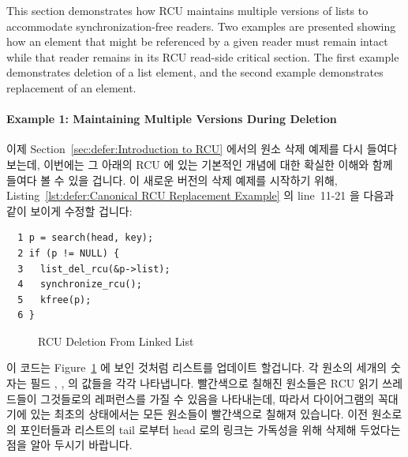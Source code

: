 This section demonstrates how RCU maintains multiple versions of
lists to accommodate synchronization-free readers.
Two examples are presented showing how an element
that might be referenced by a given reader must remain intact
while that reader remains in its RCU read-side critical section.
The first example demonstrates deletion of a list element,
and the second example demonstrates replacement of an element.
\fi

\paragraph{Example 1: Maintaining Multiple Versions During Deletion}
\label{sec:defer:Example 1: Maintaining Multiple Versions During Deletion}

이제 Section~\ref{sec:defer:Introduction to RCU} 에서의 원소 삭제 예제를 다시
들여다 보는데, 이번에는 그 아래의 RCU 에 있는 기본적인 개념에 대한 확실한
이해와 함께 들여다 볼 수 있을 겁니다.
이 새로운 버전의 삭제 예제를 시작하기 위해,
Listing~\ref{lst:defer:Canonical RCU Replacement Example} 의 line~11-21 을
다음과 같이 보이게 수정할 겁니다:

\vspace{5pt}
\begin{minipage}[t]{\columnwidth}
\scriptsize
\begin{verbatim}
  1 p = search(head, key);
  2 if (p != NULL) {
  3   list_del_rcu(&p->list);
  4   synchronize_rcu();
  5   kfree(p);
  6 }
\end{verbatim}
\end{minipage}
\vspace{5pt}

\begin{figure}[tb]
\begin{center}
\end{center}
\caption{RCU Deletion From Linked List}
\label{fig:defer:RCU Deletion From Linked List}
\end{figure}

이 코드는
Figure~\ref{fig:defer:RCU Deletion From Linked List} 에 보인 것처럼 리스트를
업데이트 할겁니다.
각 원소의 세개의 숫자는 필드 , ,  의 값들을 각각 나타냅니다.
빨간색으로 칠해진 원소들은 RCU 읽기 쓰레드들이 그것들로의 레퍼런스를 가질 수
있음을 나타내는데, 따라서 다이어그램의 꼭대기에 있는 최초의 상태에서는 모든
원소들이 빨간색으로 칠해져 있습니다.
이전 원소로의 포인터들과 리스트의 tail 로부터 head 로의 링크는 가독성을 위해
삭제해 두었다는 점을 알아 두시기 바랍니다.
\iffalse

